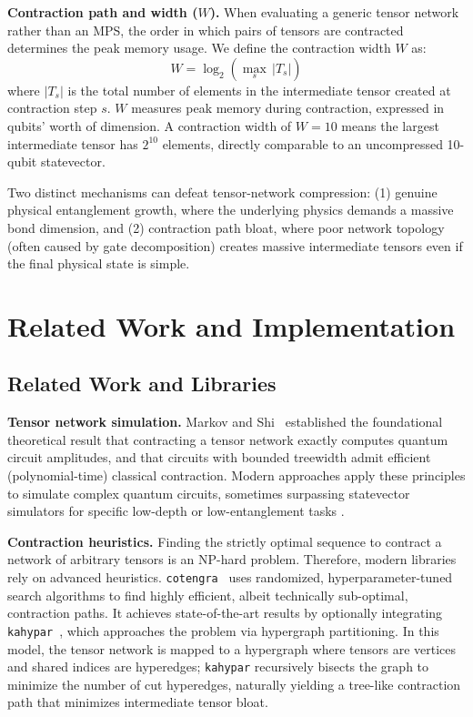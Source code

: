 \documentclass[sigconf, authorversion, nonacm]{acmart}
\begin{document}
\textbf{Contraction path and width ($W$).} When evaluating a generic tensor network rather than an MPS, the order in which pairs of tensors are contracted determines the peak memory usage. We define the contraction width $W$ as:
$$ W = \log_2 \left( \max_{s} \, |T_s| \right) $$
where $|T_s|$ is the total number of elements in the intermediate tensor created at contraction step $s$. $W$ measures peak memory during contraction, expressed in qubits' worth of dimension. A contraction width of $W=10$ means the largest intermediate tensor has $2^{10}$ elements, directly comparable to an uncompressed 10-qubit statevector.

Two distinct mechanisms can defeat tensor-network compression: (1) genuine physical entanglement growth, where the underlying physics demands a massive bond dimension, and (2) contraction path bloat, where poor network topology (often caused by gate decomposition) creates massive intermediate tensors even if the final physical state is simple.

\section{Related Work and Implementation}

\subsection{Related Work and Libraries}

\textbf{Tensor network simulation.} Markov and Shi~\cite{Markov2008} established the foundational theoretical result that contracting a tensor network exactly computes quantum circuit amplitudes, and that circuits with bounded treewidth admit efficient (polynomial-time) classical contraction. Modern approaches apply these principles to simulate complex quantum circuits, sometimes surpassing statevector simulators for specific low-depth or low-entanglement tasks \cite{Biamonte2017}.

\textbf{Contraction heuristics.} Finding the strictly optimal sequence to contract a network of arbitrary tensors is an NP-hard problem. Therefore, modern libraries rely on advanced heuristics. \texttt{cotengra}~\cite{cotengra} uses randomized, hyperparameter-tuned search algorithms to find highly efficient, albeit technically sub-optimal, contraction paths. It achieves state-of-the-art results by optionally integrating \texttt{kahypar}~\cite{kahypar}, which approaches the problem via hypergraph partitioning. In this model, the tensor network is mapped to a hypergraph where tensors are vertices and shared indices are hyperedges; \texttt{kahypar} recursively bisects the graph to minimize the number of cut hyperedges, naturally yielding a tree-like contraction path that minimizes intermediate tensor bloat.
\end{document}
